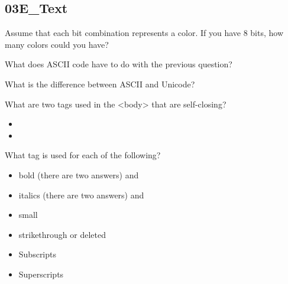 \documentclass[letterpaper,12pt]{exam}
\begin{document}
\begin{questions}
\section*{03E\_Text}
\begin{samepage}
\question Assume that each bit combination represents a color.  If you have 8 bits, how many colors could you have? 
\vspace{10mm}
\end{samepage}

\begin{samepage}
\question What does ASCII code have to do with the previous question? 
\vspace{15mm}
\end{samepage}

\begin{samepage}
\question What is the difference between ASCII and Unicode?   
\vspace{15mm}
\end{samepage}

\begin{samepage}
\question What are two tags used in the <body> that are self-closing? 
\begin{itemize}
\item
\vspace{5mm}
\item
\vspace{5mm}
\end{itemize}
\end{samepage}

\begin{samepage}
\question What tag is used for each of the following? 
\begin{itemize}
\item bold (there are two answers) \blank and \blank
\vspace{5mm}
\item italics (there are two answers) \blank and \blank
\vspace{5mm}
\item \blank small
\vspace{5mm}
\item \blank strikethrough or deleted
\vspace{5mm}
\item \blank Subscripts
\vspace {5mm}
\item \blank Superscripts
\vspace{5mm}
\end{itemize}
\end{samepage}


\end{questions}
\end{document}
